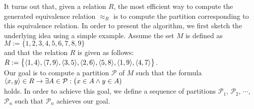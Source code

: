 It turns out that, given a relation $R$, the most efficient way to compute the generated equivalence
relation $\approx_R$ is to compute the partition corresponding to this equivalence relation.  In
order to present the algorithm, we first sketch the underlying idea using a simple example.  Assume
the set $M$ is defined as
\\
\hspace*{1.3cm}
$M := \{ 1,2,3,4,5,6,7,8,9 \}$
\\[0.2cm]
and that the relation $R$ is given as follows:
\\[0.2cm]
\hspace*{1.3cm}
$R := \bigl\{ \pair(1,4), \pair(7,9), \pair(3,5), \pair(2,6), \pair(5,8), \pair(1,9), \pair(4,7) \bigr\}$.
\\[0.2cm]
Our goal is to compute a partition $\mathcal{P}$ of $M$ such that the formula
\\[0.2cm]
\hspace*{1.3cm}
$\pair(x, y) \in R \rightarrow \exists A \in \mathcal{P}:\bigl(x \in A \wedge y \in A)$
\\[0.2cm]
holds.  In order to achieve this goal, we define a sequence of partitions $\mathcal{P}_1$,
$\mathcal{P}_2$, $\cdots$, $\mathcal{P}_n$ such that $\mathcal{P}_n$ achieves our goal.
